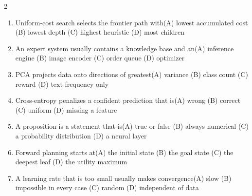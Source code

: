 \documentclass[a4paper]{article}
\begin{document}
\begin{multicols*}{2}
\begin{enumerate}[resume]
\item Uniform-cost search selects the frontier path with\newline\hspace*{0.6em}(A) lowest accumulated cost \quad (B) lowest depth \newline\hspace*{0.6em}(C) highest heuristic \quad (D) most children
\item An expert system usually contains a knowledge base and an\newline\hspace*{0.6em}(A) inference engine \quad (B) image encoder \newline\hspace*{0.6em}(C) order queue \quad (D) optimizer
\item PCA projects data onto directions of greatest\newline\hspace*{0.6em}(A) variance \quad (B) class count \newline\hspace*{0.6em}(C) reward \quad (D) text frequency only
\item Cross-entropy penalizes a confident prediction that is\newline\hspace*{0.6em}(A) wrong \quad (B) correct \newline\hspace*{0.6em}(C) uniform \quad (D) missing a feature
\item A proposition is a statement that is\newline\hspace*{0.6em}(A) true or false \quad (B) always numerical \newline\hspace*{0.6em}(C) a probability distribution \quad (D) a neural layer
\item Forward planning starts at\newline\hspace*{0.6em}(A) the initial state \quad (B) the goal state \newline\hspace*{0.6em}(C) the deepest leaf \quad (D) the utility maximum
\item A learning rate that is too small usually makes convergence\newline\hspace*{0.6em}(A) slow \quad (B) impossible in every case \newline\hspace*{0.6em}(C) random \quad (D) independent of data

\end{enumerate}
\end{multicols*}
\end{document}
